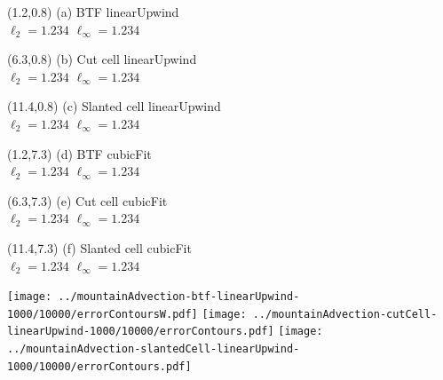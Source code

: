 \documentclass{article}
\begin{document}
\TPMargin{1pt}
\begin{textblock}{4}(1.2,0.8)
\normalsize
(a) BTF linearUpwind \\
\hspace*{1.4em}$\ell_2 = \num{1.234}$
\hspace*{1.4em}$\ell_\infty = \num{1.234}$
\end{textblock}
\begin{textblock}{4}(6.3,0.8)
\normalsize
(b) Cut cell linearUpwind \\
\hspace*{1.4em}$\ell_2 = \num{1.234}$
\hspace*{1.4em}$\ell_\infty = \num{1.234}$
\end{textblock}
\begin{textblock}{4}(11.4,0.8)
\normalsize
(c) Slanted cell linearUpwind \\
\hspace*{1.4em}$\ell_2 = \num{1.234}$
\hspace*{1.4em}$\ell_\infty = \num{1.234}$
\end{textblock}
\begin{textblock}{4}(1.2,7.3)
\normalsize
(d) BTF cubicFit \\
\hspace*{1.4em}$\ell_2 = \num{1.234}$
\hspace*{1.4em}$\ell_\infty = \num{1.234}$
\end{textblock}
\begin{textblock}{4}(6.3,7.3)
\normalsize
(e) Cut cell cubicFit \\
\hspace*{1.4em}$\ell_2 = \num{1.234}$
\hspace*{1.4em}$\ell_\infty = \num{1.234}$
\end{textblock}
\begin{textblock}{4}(11.4,7.3)
\normalsize
(f) Slanted cell cubicFit \\
\hspace*{1.4em}$\ell_2 = \num{1.234}$
\hspace*{1.4em}$\ell_\infty = \num{1.234}$
\end{textblock}
\texttt{[image: ../mountainAdvection-btf-linearUpwind-1000/10000/errorContoursW.pdf]}
\hspace*{0.26em}
\texttt{[image: ../mountainAdvection-cutCell-linearUpwind-1000/10000/errorContours.pdf]}
\hspace*{0.26em}
\texttt{[image: ../mountainAdvection-slantedCell-linearUpwind-1000/10000/errorContours.pdf]} \\
\end{document}
